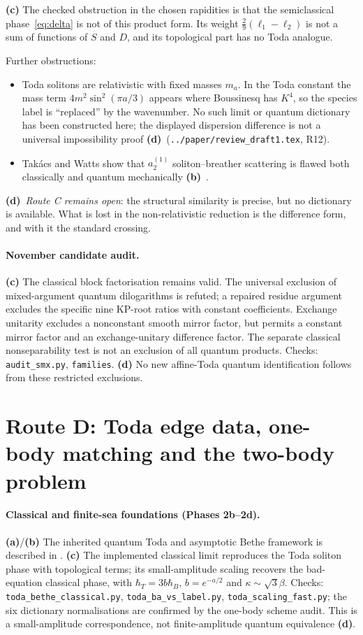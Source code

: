 \documentclass[11pt,a4paper]{article}
\newcommand{\La}{\textsf{\textbf{(a)}}\xspace}
\newcommand{\Lb}{\textsf{\textbf{(b)}}\xspace}
\newcommand{\Lc}{\textsf{\textbf{(c)}}\xspace}
\newcommand{\Ld}{\textsf{\textbf{(d)}}\xspace}
\newcommand{\file}[1]{\nolinkurl{#1}}
\theoremstyle{remark}\newtheorem{remark}[proposition]{Remark}
\begin{document}
\Lc The checked obstruction in the chosen rapidities is that the semiclassical phase~\eqref{eq:delta} is not of this product form. Its weight $\tfrac29(\ell_1-\ell_2)$ is not a sum of functions of $S$ and $D$, and its topological part has no Toda analogue.

Further obstructions:
\begin{itemize}
\item Toda solitons are relativistic with fixed masses $m_a$. In the Toda constant the mass term $4m^2\sin^2(\pi a/3)$ appears where Boussinesq has $K^4$, so the species label is ``replaced'' by the wavenumber. No such limit or quantum dictionary has been constructed here; the displayed dispersion difference is not a universal impossibility proof \Ld\ (\file{../paper/review_draft1.tex}, R12).
\item Takács and Watts show that $a_2^{(1)}$ soliton--breather scattering is flawed both classically and quantum mechanically \Lb~\cite{TW}.
\end{itemize}
\Ld\ \emph{Route C remains open}: the structural similarity is precise, but no dictionary is available. What is lost in the non-relativistic reduction is the difference form, and with it the standard crossing.

\paragraph{November candidate audit.}
\Lc The classical block factorisation remains valid. The universal exclusion
of mixed-argument quantum dilogarithms is refuted; a repaired residue argument
excludes the specific nine KP-root ratios with constant coefficients.
Exchange unitarity excludes a nonconstant smooth mirror factor, but permits a
constant mirror factor and an exchange-unitary difference factor. The separate
classical nonseparability test is not an exclusion of all quantum products.
Checks: \file{audit_smx.py}, \file{families}. \Ld No new affine-Toda quantum
identification follows from these restricted exclusions.

\section{Route D: Toda edge data, one-body matching and the two-body problem}
\paragraph{Classical and finite-sea foundations (Phases 2b--2d).}
\La/\Lb The inherited quantum Toda and asymptotic Bethe framework is described
in \cite{Gutzwiller,Sklyanin,Sutherland,Mertens,SS,PM}. \Lc The implemented
classical limit reproduces the Toda soliton phase with topological terms;
its small-amplitude scaling recovers the bad-equation classical phase, with
$\hbar_T=3b\hbar_B$, $b=e^{-a/2}$ and $\kappa\sim\sqrt3\beta$.
Checks: \file{toda_bethe_classical.py}, \file{toda_ba_vs_label.py},
\file{toda_scaling_fast.py}; the six dictionary normalisations are confirmed
by the one-body scheme audit. This is a small-amplitude correspondence,
not finite-amplitude quantum equivalence \Ld.
\end{document}
